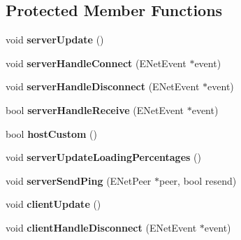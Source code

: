\subsection*{\-Protected \-Member \-Functions}
\begin{DoxyCompactItemize}
\item 
\hypertarget{classNetwork_a11cffa914d9942854970be5f4f78b274}{
void {\bfseries server\-Update} ()}
\label{d5/d16/classNetwork_a11cffa914d9942854970be5f4f78b274}

\item 
\hypertarget{classNetwork_abd5e033c1574d8d392236d89b59394cb}{
void {\bfseries server\-Handle\-Connect} (\-E\-Net\-Event $\ast$event)}
\label{d5/d16/classNetwork_abd5e033c1574d8d392236d89b59394cb}

\item 
\hypertarget{classNetwork_ab803a06abb20add63eb4955c643993dc}{
void {\bfseries server\-Handle\-Disconnect} (\-E\-Net\-Event $\ast$event)}
\label{d5/d16/classNetwork_ab803a06abb20add63eb4955c643993dc}

\item 
\hypertarget{classNetwork_ab09fab805ae0232c4469bda8dbe2d9d2}{
bool {\bfseries server\-Handle\-Receive} (\-E\-Net\-Event $\ast$event)}
\label{d5/d16/classNetwork_ab09fab805ae0232c4469bda8dbe2d9d2}

\item 
\hypertarget{classNetwork_a286a2f2e78addfc6300cfbcaf270c53c}{
bool {\bfseries host\-Custom} ()}
\label{d5/d16/classNetwork_a286a2f2e78addfc6300cfbcaf270c53c}

\item 
\hypertarget{classNetwork_a5a494725824a4126389086608dfe35e4}{
void {\bfseries server\-Update\-Loading\-Percentages} ()}
\label{d5/d16/classNetwork_a5a494725824a4126389086608dfe35e4}

\item 
\hypertarget{classNetwork_a2225ba5fd30eb9de8f4d140ea6d708ec}{
void {\bfseries server\-Send\-Ping} (\-E\-Net\-Peer $\ast$peer, bool resend)}
\label{d5/d16/classNetwork_a2225ba5fd30eb9de8f4d140ea6d708ec}

\item 
\hypertarget{classNetwork_a414676aec00f597d6fc32997bddbf03e}{
void {\bfseries client\-Update} ()}
\label{d5/d16/classNetwork_a414676aec00f597d6fc32997bddbf03e}

\item 
\hypertarget{classNetwork_a9f7923916188b77e3536ae0a30d4d898}{
void {\bfseries client\-Handle\-Disconnect} (\-E\-Net\-Event $\ast$event)}
\label{d5/d16/classNetwork_a9f7923916188b77e3536ae0a30d4d898}


\end{DoxyCompactItemize}
